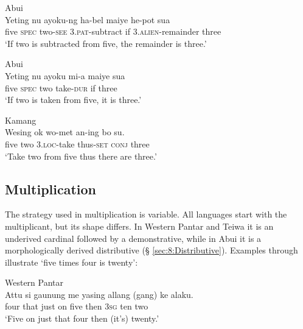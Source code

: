 \ea
\label{ex:8:1242}
{\upshape Abui}\\
 \gll Yeting  nu  ayoku-ng  ha-bel  maiye  he-pot  sua\\
  five  \textsc{spec}   two-\textsc{see } 3.\textsc{pat}{}-subtract  if  \textsc{3.alien}{}-remainder  three \\
 \glt `If two is subtracted from five, the remainder is three.' 
\z 
  
\ea
\label{ex:8:1243}
{\upshape Abui}\\
 \gll Yeting  nu  ayoku  mi-a  maiye  sua\\
  five  \textsc{spec } two  take-\textsc{dur } if  three   \\
 \glt `If two is taken from five, it is three.' 
\z
 
  

\ea%
\label{bkm:Ref358115306}
  
{\upshape Kamang}\\
\gll  Wesing  ok  wo-met  an-ing  bo  su.   \\  
    five  two   3.\textsc{loc-}take  thus\textsc{{}-set}  \textsc{conj} three   \\
\glt `Take two from five thus there are three.' 
\z



 

 

\subsection{Multiplication}
\label{sec:8:Multiplication}
The strategy used in multiplication is variable. All languages start with the multiplicant, but its shape differs. In Western Pantar and Teiwa it is an underived cardinal followed by a demonstrative, while in Abui it is a morphologically derived distributive ({\S} \ref{sec:8:Distributive}). Examples  through   illustrate `five times four is twenty':


\ea%
\label{bkm:Ref358043144}
{\upshape Western Pantar}\\
\gll Attu  si  gaunung  me  yasing   allang  (gang)  ke alaku. \\  
   four  that  just  on  five  then  3\textsc{sg } ten two   \\
\glt `Five on just that four then (it's) twenty.'
\z


